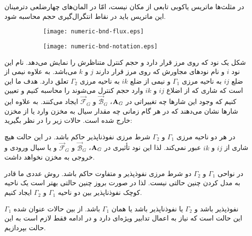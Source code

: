 در مثلث‌ها ماتریس یاکوبی تابعی از مکان نیست، امّا در المان‌های چهارضلعی دترمینان این ماتریس باید در نقاط انتگرال‌گیری حجم محاسبه شود.

\begin{figure}
\begin{subfigure}{.5\textwidth}
\texttt{[image: numeric-bnd-flux.eps]} 
\label{fig:3bnd-imaj}
\end{subfigure}
\begin{subfigure}{0.5\textwidth}
\texttt{[image: numeric-bnd-notation.eps]} 
\label{fig:3bnd-real}
\end{subfigure}
\label{fig:3bnd}
\end{figure}

شکل  یک نود که روی مرز قرار دارد و حجم کنترل متناظرش را نمایش می‌دهد. نام این نود $i$ و نام نود‌های مجاورش که روی مرز قرار دارند $j$ و $k$ می‌باشد. به علاوه نیمی از ضلع $ij$ به ناحیه مرزی $\Gamma_1$ و نیمی  از ضلع $ik$ به ناحیه مرزی $\Gamma_2$ تعلق دارد. هدف ما این است که شاری که از اضلاع $ij$ و $ik$ وارد حجم کنترل می‌شوند را محاسبه کنیم و تعیین کنیم که وجود این شار‌ها چه تغییراتی در
 $\textbf A_G$، $\vec{\mathcal B}_G$ و $\vec{\mathcal F}_G$
ایجاد می‌کنند. به علاوه  این شار‌ها نشان می‌دهند که در هر گام زمانی چه مقدار سیال به مخزن وارد یا از مخزن خارج شده است. حالات زیر را در نظر بگیرید:
\begin{tight_enumerate}
 در هر دو ناحیه مرزی $\Gamma_1$ و $\Gamma_2$ شرط مرزی نفوذناپذیر حاکم باشد. در این حالت هیچ شاری از $ij$ و $ik$ عبور نمی‌کند. لذا این نود تأثیری در $\textbf A_G$، $\vec{\mathcal B}_G$ و $\vec{\mathcal F}_G$ و یا سیال ورودی و خروجی به مخزن نخواهد داشت.

 در نواحی $\Gamma_1$ و $\Gamma_2$ دو شرط مرزی نفوذپذیر و متفاوت حاکم باشد. روش عددی ما قادر به مدل کردن چنین حالتی نیست. لذا در صورت بروز چنین حالتی بهتر است یک ناحیه کوچک نفوذناپذیر بین دو ناحیه $\Gamma_1$ و $\Gamma_2$ ایجاد کنیم.

 $\Gamma_1$ نفوذپذیر باشد و $\Gamma_2$ یا نفوذناپذیر باشد یا همان $\Gamma_1$ باشد. از بین حالات عنوان شده این حالت است که نیاز به اعمال تدابیر ویژه‌ای دارد و در ادامه فقط لازم است به این حالت بپردازیم.
\end{tight_enumerate}

